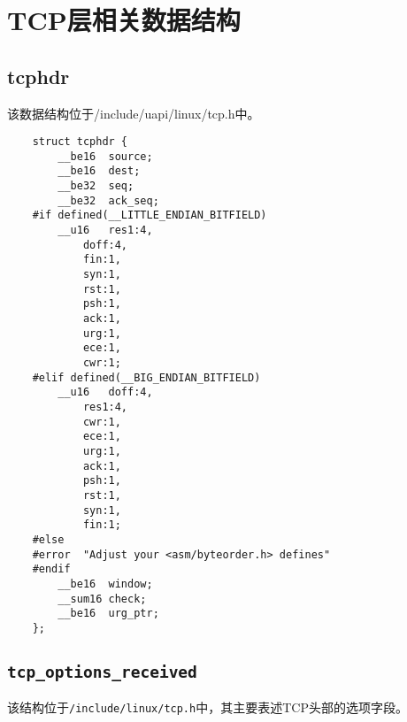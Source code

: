     \section{TCP层相关数据结构}
        \subsection{tcphdr}
            该数据结构位于/include/uapi/linux/tcp.h中。
\begin{verbatim}
    struct tcphdr {
        __be16  source;
        __be16  dest;
        __be32  seq;
        __be32  ack_seq;
    #if defined(__LITTLE_ENDIAN_BITFIELD)
        __u16   res1:4,
            doff:4,
            fin:1,
            syn:1,
            rst:1,
            psh:1,
            ack:1,
            urg:1,
            ece:1,
            cwr:1;
    #elif defined(__BIG_ENDIAN_BITFIELD)
        __u16   doff:4,
            res1:4,
            cwr:1,
            ece:1,
            urg:1,
            ack:1,
            psh:1,
            rst:1,
            syn:1,
            fin:1;
    #else
    #error  "Adjust your <asm/byteorder.h> defines"
    #endif  
        __be16  window;
        __sum16 check;
        __be16  urg_ptr;
    };
\end{verbatim}

        \subsection{\texttt{tcp_options_received}}

        该结构位于\texttt{/include/linux/tcp.h}中，其主要表述TCP头部的选项字段。

